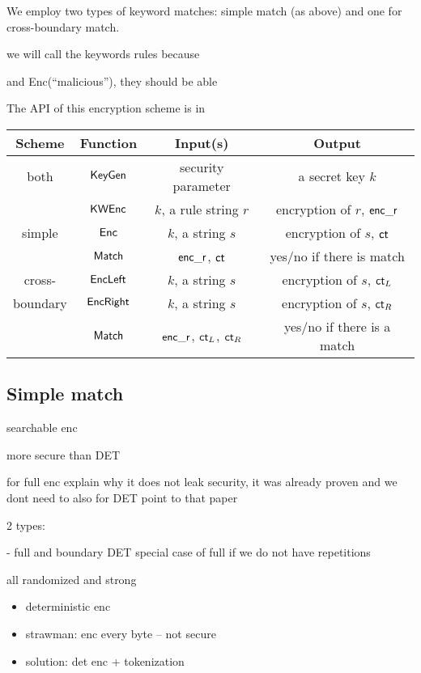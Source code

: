 We employ two types of keyword matches: simple match (as above) and one for cross-boundary match. 


we will call the keywords rules because 

 and Enc(``malicious''), they should be able 

The API of this encryption scheme is in 


\begin{tabular}{c|c|c|c}
Scheme    & Function        & Input(s) & Output \\
\hline
 both                & $\mathsf{KeyGen}$     & security parameter	      & a secret key $k$ \\ 
                 & $\mathsf{KWEnc}$	& $k$, a rule string $r$   &  encryption of $r$, $\mathsf{enc\_r}$ \\
\hline
  simple               & $\mathsf{Enc}$           &  $k$, a string $s$                        &  encryption of $s$, $\mathsf{ct}$          \\
                 & $\mathsf{Match}$  & $\mathsf{enc\_r}$, $\mathsf{ct}$ & yes/no if there is match \\
\hline
  cross-               & $\mathsf{EncLeft}$  & $k$, a string $s$ &encryption of $s$, $\mathsf{ct}_L$   \\
   boundary              & $\mathsf{EncRight}$ & $k$, a string $s$ & encryption of $s$, $\mathsf{ct}_R$  \\
                 & $\mathsf{Match}$ & $\mathsf{enc\_r}$, $\mathsf{ct}_L$, $\mathsf{ct}_R$ & yes/no if there is a match \\
\end{tabular}


\subsection{Simple match}


searchable enc

more secure than DET

for full enc explain why it does not leak security, it was already proven and we dont need to 
also for DET point to that paper 

2 types:

- full and boundary
DET special case of full if we do not have repetitions

all randomized and strong

\begin{itemize}
\item deterministic enc
\item strawman: enc every byte -- not secure
\item solution: det enc + tokenization
\end{itemize}

